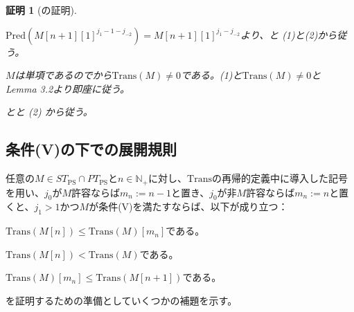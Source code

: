 \documentclass[dvipdfmx,uplatex]{jsarticle}
\theoremstyle{customnonumberbreakfortheorem}
\theoremstyle{customnonumberbreakforproof}
\newtheorem{hideableproof}{証明}
\begin{document}
\begin{hideableproof}[の証明]
	\begin{penumerate}
		\item \(\textrm{Pred}(M[n+1][1]^{j_1-1-j_{-2}}) = M[n+1][1]^{j_1-j_{-2}}\)より、と (1)と(2)から従う。
		\item \(M\)は単項であるのでから\(\textrm{Trans}(M) \neq 0\)である。(1)と\(\textrm{Trans}(M) \neq 0\)と\cite{buc1} Lemma 3.2より即座に従う。
		\item {}とと (2) から従う。
	\end{penumerate}
\end{hideableproof}


\subsection{条件(V)の下での展開規則}

\begin{proposition}\label{条件(V)の下でのTransと基本列の交換関係}
	任意の\(M \in ST_{\textrm{PS}} \cap PT_{\textrm{PS}}\)と\(n \in \mathbb{N}_{+}\)に対し、\(\textrm{Trans}\)の再帰的定義中に導入した記号を用い、\(j_0\)が\(M\)許容ならば\(m_n := n-1\)と置き、\(j_0\)が非\(M\)許容ならば\(m_n := n\)と置くと、\(j_1 > 1\)かつ\(M\)が条件(V)を満たすならば\footnotemark{}、以下が成り立つ：
	\begin{penumerate}
		\item \(\textrm{Trans}(M[n]) \leq \textrm{Trans}(M)[m_n]\)である。
		\item \(\textrm{Trans}(M[n]) < \textrm{Trans}(M)\)である。
		\item \(\textrm{Trans}(M)[m_n] \leq \textrm{Trans}(M[n+1])\)である。
	\end{penumerate}
\end{proposition}

を証明するための準備としていくつかの補題を示す。
\end{document}
